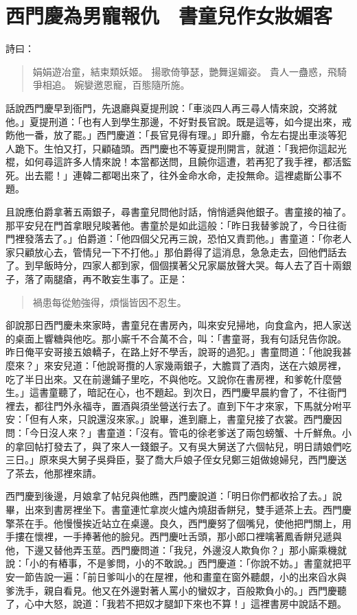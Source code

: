 
\chapter{西門慶為男寵報仇　書童兒作女妝媚客}

詩曰：
\begin{quote}
娟娟遊冶童，結束類妖姬。
揚歌倚箏瑟，艷舞逞媚姿。
貴人一蠱惑，飛騎爭相追。
婉孌邀恩寵，百態隨所施。
\end{quote}

話說西門慶早到衙門，先退廳與夏提刑說：「車淡四人再三尋人情來說，交將就他。」夏提刑道：「也有人到學生那邊，不好對長官說。既是這等，如今提出來，戒飭他一番，放了罷。」西門慶道：「長官見得有理。」即升廳，令左右提出車淡等犯人跪下。生怕又打，只顧磕頭。西門慶也不等夏提刑開言，就道：「我把你這起光棍，如何尋這許多人情來說！本當都送問，且饒你這遭，若再犯了我手裡，都活監死。出去罷！」連韓二都喝出來了，往外金命水命，走投無命。這裡處斷公事不題。

且說應伯爵拿著五兩銀子，尋書童兒問他討話，悄悄遞與他銀子。書童接的袖了。那平安兒在門首拿眼兒睃著他。書童於是如此這般：「昨日我替爹說了，今日往衙門裡發落去了。」伯爵道：「他四個父兄再三說，恐怕又責罰他。」書童道：「你老人家只顧放心去，管情兒一下不打他。」那伯爵得了這消息，急急走去，回他們話去了。到早飯時分，四家人都到家，個個撲著父兄家屬放聲大哭。每人去了百十兩銀子，落了兩腿瘡，再不敢妄生事了。正是：
\begin{quote}
禍患每從勉強得，煩惱皆因不忍生。
\end{quote}

卻說那日西門慶未來家時，書童兒在書房內，叫來安兒掃地，向食盒內，把人家送的桌面上響糖與他吃。那小廝千不合萬不合，叫：「書童哥，我有句話兒告你說。昨日俺平安哥接五娘轎子，在路上好不學舌，說哥的過犯。」書童問道：「他說我甚麼來？」來安兒道：「他說哥攬的人家幾兩銀子，大膽買了酒肉，送在六娘房裡，吃了半日出來。又在前邊鋪子里吃，不與他吃。又說你在書房裡，和爹乾什麼營生。」這書童聽了，暗記在心，也不題起。到次日，西門慶早晨約會了，不往衙門裡去，都往門外永福寺，置酒與須坐營送行去了。直到下午才來家，下馬就分咐平安：「但有人來，只說還沒來家。」說畢，進到廳上，書童兒接了衣裳。西門慶因問：「今日沒人來？」書童道：「沒有。管屯的徐老爹送了兩包螃蟹、十斤鮮魚。小的拿回帖打發去了，與了來人一錢銀子。又有吳大舅送了六個帖兒，明日請娘們吃三日。」原來吳大舅子吳舜臣，娶了喬大戶娘子侄女兒鄭三姐做媳婦兒，西門慶送了茶去，他那裡來請。

西門慶到後邊，月娘拿了帖兒與他瞧，西門慶說道：「明日你們都收拾了去。」說畢，出來到書房裡坐下。書童連忙拿炭火爐內燒甜香餅兒，雙手遞茶上去。西門慶擎茶在手。他慢慢挨近站立在桌邊。良久，西門慶努了個嘴兒，使他把門關上，用手摟在懷裡，一手捧著他的臉兒。西門慶吐舌頭，那小郎口裡噙著鳳香餅兒遞與他，下邊又替他弄玉莖。西門慶問道：「我兒，外邊沒人欺負你？」那小廝乘機就說：「小的有樁事，不是爹問，小的不敢說。」西門慶道：「你說不妨。」書童就把平安一節告說一遍：「前日爹叫小的在屋裡，他和畫童在窗外聽覷，小的出來舀水與爹洗手，親自看見。他又在外邊對著人罵小的蠻奴才，百般欺負小的。」西門慶聽了，心中大怒，說道：「我若不把奴才腿卸下來也不算！」這裡書房中說話不題。

